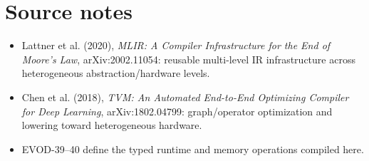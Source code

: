 \chapter*{Source notes}
\begin{itemize}
\item Lattner et al. (2020), \emph{MLIR: A Compiler Infrastructure for the End of Moore's Law}, arXiv:2002.11054: reusable multi-level IR infrastructure across heterogeneous abstraction/hardware levels.
\item Chen et al. (2018), \emph{TVM: An Automated End-to-End Optimizing Compiler for Deep Learning}, arXiv:1802.04799: graph/operator optimization and lowering toward heterogeneous hardware.
\item EVOD-39--40 define the typed runtime and memory operations compiled here.
\end{itemize}
